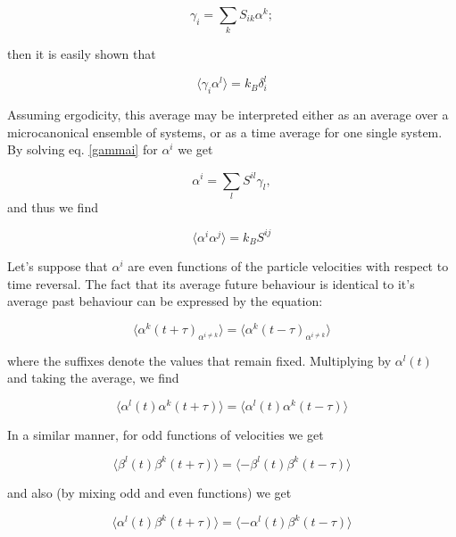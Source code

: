 \documentclass[a4paper,12pt,nofootinbib]{article}
\begin{document}
\begin{equation}
\gamma_i =\sum_k S_{ik} \alpha^k; \label{gammai}	
\end{equation}
  

then it is easily shown that

\begin{equation}
\langle \gamma_i \alpha^l \rangle = k_B \delta_i^l	
\end{equation}

Assuming ergodicity, this average may be interpreted either as an average over a microcanonical ensemble of systems, or as a time average for one single system.
By solving eq. \ref{gammai} for $\alpha^i $ we get

\begin{equation}
  \alpha^i=\sum_l S^{il}\gamma_l,
\end{equation}
and thus we find

\begin{equation}
	\langle \alpha^i \alpha^j \rangle = k_B S^{ij}   
\end{equation}

Let's suppose that $\alpha^i$ are even functions of the particle velocities with respect to time reversal.
The fact that its average future behaviour is identical to it's average past behaviour can be expressed by the equation:

\begin{equation}
  \langle \alpha^k (t+\tau)_{\alpha^{i \neq k}} \rangle =   \langle \alpha^k(t-\tau)_{\alpha^{i \neq k}} \rangle
\end{equation}

where the suffixes denote the values that remain fixed. Multiplying by $\alpha^l(t)$ and taking the average, we find

\begin{equation}
  \langle \alpha^l(t) \alpha^k (t+\tau) \rangle = \langle \alpha^l(t) \alpha^k(t-\tau) \rangle
\end{equation}

In a similar manner, for odd functions of velocities we get

\begin{equation}
  \langle \beta^l(t) \beta^k (t+\tau) \rangle = \langle - \beta^l(t) \beta^k(t-\tau) \rangle
\end{equation}

and also (by mixing odd and even functions) we get

\begin{equation}
  \langle \alpha^l(t) \beta^k (t+\tau) \rangle = \langle - \alpha^l(t) \beta^k(t-\tau) \rangle
\end{equation}
\end{document}
